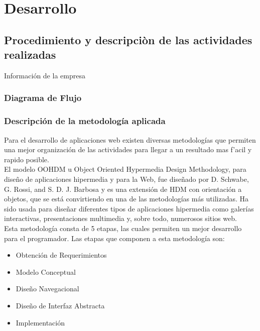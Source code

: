 \renewcommand{\thesection}{\Roman{section}}
\section{Desarrollo}

\renewcommand{\thesection}{\arabic{section}}
\subsection{Procedimiento y descripciòn de las actividades realizadas}

{\large Información de la empresa}\\

\subsubsection{Diagrama de Flujo}

\subsubsection{Descripción de la metodología aplicada}

{\large Para el desarrollo de aplicaciones web existen diversas metodologías que permiten una mejor organización de las actividades para llegar a un resultado mas f'{a}cil y rapido posible.}\\

{\large El modelo OOHDM u Object Oriented Hypermedia Design Methodology, para diseño de aplicaciones hipermedia y para la Web, fue diseñado por D. Schwabe, G. Rossi, and S. D. J. Barbosa y es una extensión de HDM con orientación a objetos, que se está convirtiendo en una de las metodologías más utilizadas. Ha sido usada para diseñar diferentes tipos de aplicaciones hipermedia como galerías interactivas, presentaciones multimedia y, sobre todo, numerosos sitios web.}\\

{\large Esta metodología consta de 5 etapas, las cuales permiten un mejor desarrollo para el programador. Las etapas que componen a esta metodología son:}\\

\begin{itemize}
\item Obtención de Requerimientos
\item Modelo Conceptual
\item Diseño Navegacional
\item Diseño de Interfaz Abstracta
\item Implementación
\end{itemize}


